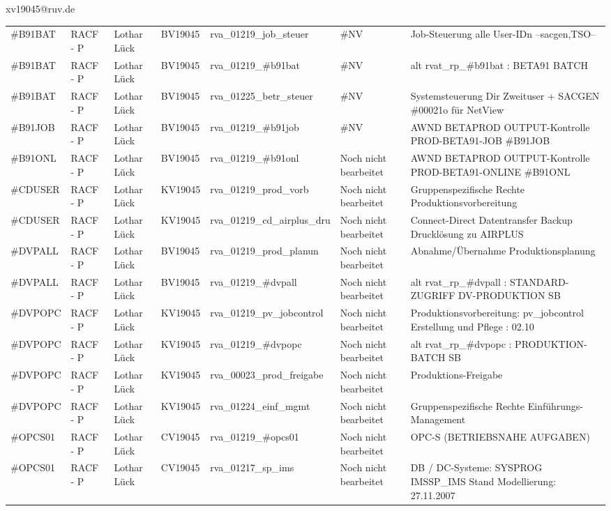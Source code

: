 \documentclass[a4paper,landscape,12pt]{letter}
\begin{document}
\begin{letter}{xv19045@ruv.de\hfill \break}
\begin{tiny}
\begin{longtable}{|p{35mm}|p{15mm}|p{25mm}|p{10mm}|p{40mm}|p{50mm}|p{50mm}|}
\#B91BAT & RACF - P & Lothar Lück & BV19045 & rva\_01219\_job\_steuer & \#NV & Job-Steuerung alle User-IDn --sacgen,TSO-- \\
\#B91BAT & RACF - P & Lothar Lück & BV19045 & rva\_01219\_\#b91bat & \#NV & alt rvat\_rp\_\#b91bat          : BETA91 BATCH \\
\#B91BAT & RACF - P & Lothar Lück & BV19045 & rva\_01225\_betr\_steuer & \#NV & Systemsteuerung Dir Zweituser + SACGEN \#00021o für NetView \\
\#B91JOB & RACF - P & Lothar Lück & BV19045 & rva\_01219\_\#b91job & \#NV & AWND BETAPROD OUTPUT-Kontrolle PROD-BETA91-JOB \#B91JOB \\
\#B91ONL & RACF - P & Lothar Lück & BV19045 & rva\_01219\_\#b91onl & Noch nicht bearbeitet & AWND BETAPROD OUTPUT-Kontrolle PROD-BETA91-ONLINE \#B91ONL \\
\#CDUSER & RACF - P & Lothar Lück & KV19045 & rva\_01219\_prod\_vorb & Noch nicht bearbeitet & Gruppenspezifische Rechte Produktionsvorbereitung \\
\#CDUSER & RACF - P & Lothar Lück & KV19045 & rva\_01219\_cd\_airplus\_dru & Noch nicht bearbeitet & Connect-Direct Datentransfer Backup Drucklösung zu AIRPLUS \\
\#DVPALL & RACF - P & Lothar Lück & BV19045 & rva\_01219\_prod\_planun & Noch nicht bearbeitet & Abnahme/Übernahme Produktionsplanung \\
\#DVPALL & RACF - P & Lothar Lück & BV19045 & rva\_01219\_\#dvpall & Noch nicht bearbeitet & alt rvat\_rp\_\#dvpall          : STANDARD-ZUGRIFF DV-PRODUKTION SB \\
\#DVPOPC & RACF - P & Lothar Lück & KV19045 & rva\_01219\_pv\_jobcontrol & Noch nicht bearbeitet & Produktionsvorbereitung: pv\_jobcontrol Erstellung und Pflege : 02.10 \\
\#DVPOPC & RACF - P & Lothar Lück & KV19045 & rva\_01219\_\#dvpopc & Noch nicht bearbeitet & alt rvat\_rp\_\#dvpopc          : PRODUKTION-BATCH SB \\
\#DVPOPC & RACF - P & Lothar Lück & KV19045 & rva\_00023\_prod\_freigabe & Noch nicht bearbeitet & Produktions-Freigabe \\
\#DVPOPC & RACF - P & Lothar Lück & KV19045 & rva\_01224\_einf\_mgmt & Noch nicht bearbeitet & Gruppenspezifische Rechte Einführungs-Management \\
\#OPCS01 & RACF - P & Lothar Lück & CV19045 & rva\_01219\_\#opcs01 & Noch nicht bearbeitet & OPC-S (BETRIEBSNAHE AUFGABEN) \\
\#OPCS01 & RACF - P & Lothar Lück & CV19045 & rva\_01217\_sp\_ims & Noch nicht bearbeitet & DB / DC-Systeme:  SYSPROG IMSSP\_IMS Stand Modellierung: 27.11.2007 \\

\end{longtable}
\end{tiny}
\end{letter}
\end{document}
